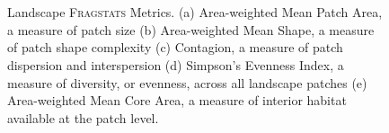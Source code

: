 
\begin{figure}[!htbp]
  \centering
   \\
   \\
\caption{Landscape \textsc{Fragstats} Metrics. (a) Area-weighted Mean Patch Area, a measure of patch size (b) Area-weighted Mean Shape, a measure of patch shape complexity (c) Contagion, a measure of patch dispersion and interspersion (d) Simpson's Evenness Index, a measure of diversity, or evenness, across all landscape patches (e) Area-weighted Mean Core Area, a measure of interior habitat available at the patch level.}
\label{fig:fragland}
\end{figure}


